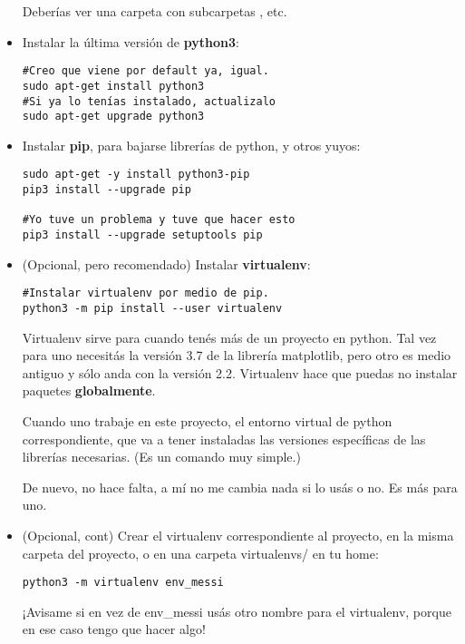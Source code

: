 \documentclass[10pt,a4paper]{report}
\begin{document}
\begin{itemize}
Deberías ver una carpeta  con subcarpetas , etc.

\item Instalar la última versión de \textbf{python3}:

\begin{lstlisting}
#Creo que viene por default ya, igual.
sudo apt-get install python3
#Si ya lo tenías instalado, actualizalo
sudo apt-get upgrade python3
\end{lstlisting}

\item Instalar \textbf{pip}, para bajarse librerías de python, y otros yuyos:

\begin{lstlisting}
sudo apt-get -y install python3-pip
pip3 install --upgrade pip

#Yo tuve un problema y tuve que hacer esto
pip3 install --upgrade setuptools pip
\end{lstlisting}

\item (Opcional, pero recomendado) Instalar \textbf{virtualenv}:

\begin{lstlisting}
#Instalar virtualenv por medio de pip.
python3 -m pip install --user virtualenv
\end{lstlisting}

Virtualenv sirve para cuando tenés más de un proyecto en python. Tal vez para uno necesitás la versión 3.7 de la librería matplotlib, pero otro es medio antiguo y sólo anda con la versión 2.2. Virtualenv hace que puedas no instalar paquetes \textbf{globalmente}.

Cuando uno trabaje en este proyecto,  el entorno virtual de python correspondiente, que va a tener instaladas las versiones específicas de las librerías necesarias. (Es un comando muy simple.)

De nuevo, no hace falta, a mí no me cambia nada si lo usás o no. Es más para uno.

\item (Opcional, cont) Crear el virtualenv correspondiente al proyecto, en la misma carpeta del proyecto, o en una carpeta virtualenvs/ en tu home:

\begin{lstlisting}
python3 -m virtualenv env_messi
\end{lstlisting}

¡Avisame si en vez de env\_messi usás otro nombre para el virtualenv, porque en ese caso tengo que hacer algo!


\end{itemize}
\end{document}
